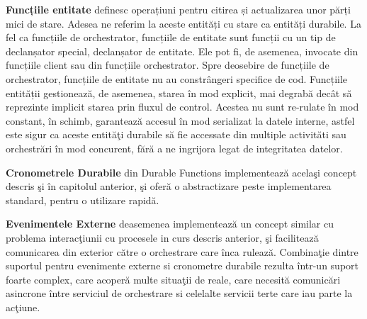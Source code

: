 \par \textbf{Funcțiile entitate} definesc operațiuni pentru citirea și actualizarea unor părți mici de stare. Adesea ne referim la aceste entități cu stare ca entități durabile. La fel ca funcțiile de orchestrator, funcțiile de entitate sunt funcții cu un tip de declanșator special, declanșator de entitate. Ele pot fi, de asemenea, invocate din funcțiile client sau din funcțiile orchestrator. Spre deosebire de funcțiile de orchestrator, funcțiile de entitate nu au constrângeri specifice de cod. Funcțiile entității gestionează, de asemenea, starea în mod explicit, mai degrabă decât să reprezinte implicit starea prin fluxul de control. Acestea nu sunt re-rulate în mod constant, în schimb, garantează accesul în mod serializat la datele interne, astfel este sigur ca aceste entităţi durabile să fie accessate din multiple activităti sau orchestrări în mod concurent, fără a ne ingrijora legat de integritatea datelor. 
\par \textbf{Cronometrele Durabile} din Durable Functions implementează acelaşi concept descris şi în capitolul anterior, şi oferă o abstractizare peste implementarea standard, pentru o utilizare rapidă. 
\par \textbf{Evenimentele Externe} deasemenea implementează un concept similar cu problema interacţiunii cu procesele in curs descris anterior, şi facilitează comunicarea din exterior către o orchestrare care înca rulează. Combinaţie dintre suportul pentru evenimente externe si cronometre durabile rezulta într-un suport foarte complex, care acoperă multe situaţii de reale, care necesită comunicări asincrone între serviciul de orchestrare si celelalte servicii terte care iau parte la acţiune. 
